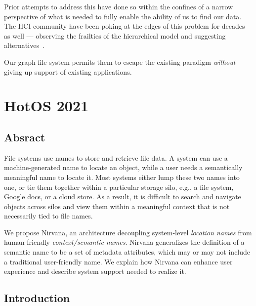 Prior attempts to address this have done so within the confines of a narrow perspective of what is needed to fully
enable the ability of us to find our data.  The HCI community have been poking at the
edges of this problem for decades as well --- observing the frailties of the hierarchical model and suggesting
alternatives~\cite{harper2013file,lindley2018exploring,khan2018forgotten,vitale2018hoarding,boardman2003too,nayuki2017,martin2014,Jan2011,Andrews2012,Mander1992,Omvlee2009}.

Our graph file system permits them to escape the existing paradigm \textit{without} giving up support
of existing applications.


\section{HotOS 2021}
\label{ch:appendix:section:hotos21}

\subsection{Absract}
File systems use names to store and retrieve file data. A system can use a
machine-generated name to locate an object, while a user needs a semantically
meaningful name to locate it. Most systems either lump these two names into one,
or tie them together within a particular storage silo, e.g., a file system,
Google docs, or a cloud store. As a result, it is difficult to search and
navigate objects across silos and view them within a meaningful context that is
not necessarily tied to file names.

We propose Nirvana, an architecture decoupling system-level \textit{location
    names} from human-friendly \textit{context/semantic names}. Nirvana generalizes
the definition of a semantic name to be a set of metadata attributes, which may
or may not include a traditional user-friendly name. We explain how Nirvana can
enhance user experience and describe system support needed to realize it.

\subsection{Introduction}
\label{hotos21:introduction}


